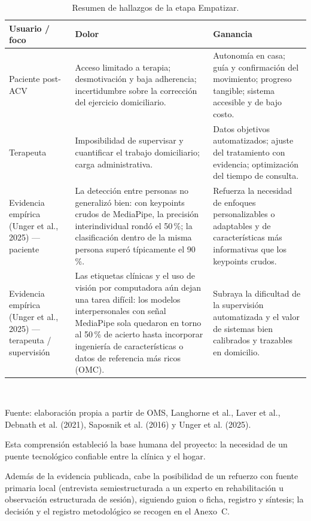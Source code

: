 \documentclass[11pt,a4paper]{article}
\renewcommand{\arraystretch}{1.35}
\begin{document}
\begin{table}[htbp]
\caption{Resumen de hallazgos de la etapa Empatizar.}
\label{tab:empatizar}
\small
\centering
\renewcommand{\arraystretch}{1.35}
\begin{tabular}{@{}p{2.5cm}p{4.7cm}p{4.7cm}@{}}
\toprule
Usuario / foco & Dolor & Ganancia \\
\midrule
Paciente post-ACV & Acceso limitado a terapia; desmotivación y baja adherencia; incertidumbre sobre la corrección del ejercicio domiciliario. & Autonomía en casa; guía y confirmación del movimiento; progreso tangible; sistema accesible y de bajo costo. \\
\addlinespace
Terapeuta & Imposibilidad de supervisar y cuantificar el trabajo domiciliario; carga administrativa. & Datos objetivos automatizados; ajuste del tratamiento con evidencia; optimización del tiempo de consulta. \\
\addlinespace
Evidencia empírica (Unger et al., 2025) --- paciente & La detección entre personas no generalizó bien: con keypoints crudos de MediaPipe, la precisión interindividual rondó el 50\,\%; la clasificación dentro de la misma persona superó típicamente el 90\,\%. & Refuerza la necesidad de enfoques personalizables o adaptables y de características más informativas que los keypoints crudos. \\
\addlinespace
Evidencia empírica (Unger et al., 2025) --- terapeuta / supervisión & Las etiquetas clínicas y el uso de visión por computadora aún dejan una tarea difícil: los modelos interpersonales con señal MediaPipe sola quedaron en torno al 50\,\% de acierto hasta incorporar ingeniería de características o datos de referencia más ricos (OMC). & Subraya la dificultad de la supervisión automatizada y el valor de sistemas bien calibrados y trazables en domicilio. \\
\bottomrule
\end{tabular}\\
\renewcommand{\arraystretch}{1.35}
\vspace{4pt}
\raggedright\footnotesize Fuente: elaboración propia a partir de OMS, Langhorne et al., Laver et al., Debnath et al. (2021), Saposnik et al. (2016) y Unger et al. (2025).
\end{table}
\vspace{0.6em}

Esta comprensión estableció la base humana del proyecto: la necesidad de un puente tecnológico confiable entre la clínica y el hogar.

Además de la evidencia publicada, cabe la posibilidad de un refuerzo con fuente primaria local (entrevista semiestructurada a un experto en rehabilitación u observación estructurada de sesión), siguiendo guion o ficha, registro y síntesis; la decisión y el registro metodológico se recogen en el Anexo~C.
\end{document}
